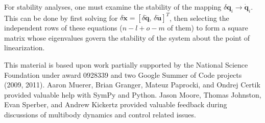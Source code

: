\documentclass{svjour3}                     %
\begin{document}
For stability analyses, one must examine the stability of the mapping $\delta
\bm{q}_i \to \bm{\dot{q}}_i$.  This can be done by first solving for
$\delta\bm{\dot{x}} = \left[\delta\bm{\dot{q}},\,\delta\bm{\dot{u}}\right]^{T}$, then selecting
the independent rows of these equations ($n-l+o-m$ of them) to form a square
matrix whose eigenvalues govern the stability of the system about the point of
linearization.

\begin{acknowledgements}
  This material is based upon work partially supported by the National Science
  Foundation under award 0928339 and two Google Summer of Code projects (2009,
  2011).  Aaron Muerer, Brian Granger, Mateuz Paprocki, and Ondrej Certik
  provided valuable help with SymPy and Python.  Jason Moore, Thomas Johnston,
  Evan Sperber, and Andrew Kickertz provided valuable feedback during
  discussions of multibody dynamics and control related issues.
\end{acknowledgements}

\end{document}
